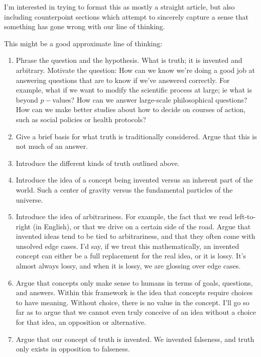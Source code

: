 \documentclass[11pt, oneside]{article}   	%
\begin{document}
I'm interested in trying to format this as mostly a straight article, but also
including counterpoint sections which attempt to sincerely capture a sense that
something has gone wrong with our line of thinking.

This might be a good approximate line of thinking:
\begin{enumerate}
    \item Phrase the question and the hypothesis. What is truth; it is invented
        and arbitrary. Motivate the question: How can we know we're doing a good
        job at answering questions that are to know if we've answered correctly.
        For example, what if we want to modify the scientific process at large;
        ie what is beyond $p-$values? How can we answer large-scale
        philosophical questions? How can we make better studies about how to
        decide on courses of action, such as social policies or health
        protocols?
    \item Give a brief basis for what truth is traditionally considered. Argue
        that this is not much of an answer.
    \item Introduce the different kinds of truth outlined above.
    \item Introduce the idea of a concept being invented versus an inherent part
        of the world. Such a center of gravity versus the fundamental particles
        of the universe.
    \item Introduce the idea of arbitrariness. For example, the fact that we
        read left-to-right (in English), or that we drive on a certain side of
        the road. Argue that invented ideas tend to be tied to arbitrariness,
        and that they often come with unsolved edge cases. I'd say, if we treat
        this mathematically, an invented concept can either be a full
        replacement for the real idea, or it is lossy. It's almost always lossy,
        and when it is lossy, we are glossing over edge cases.
    \item Argue that concepts only make sense to humans in terms of goals,
        questions, and answers. Within this framework is the idea that concepts
        require choices to have meaning. Without choice, there is no value in
        the concept. I'll go so far as to argue that we cannot even truly
        conceive of an idea without a choice for that idea, an opposition or
        alternative.
    \item Argue that our concept of truth is invented. We invented falseness,
        and truth only exists in opposition to falseness.

\end{enumerate}
\end{document}
